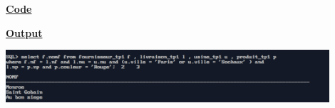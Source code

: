 \newpage
{}

\textbf{\underline{Code}}


\vspace{1cm}
\textbf{\underline{Output}}
\vspace{1cm}
\begin{center}
    \includegraphics[width=0.9\textwidth]{Questions/q18/q18.png}
\end{center}



